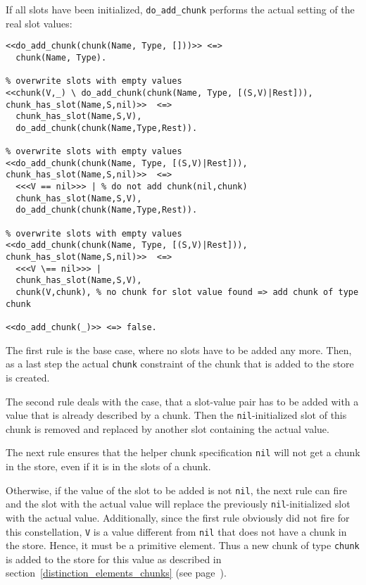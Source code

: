 If all slots have been initialized, \lstinline|do_add_chunk| performs the actual setting of the real slot values:
  
\begin{lstlisting}[caption={Additional rules for adding chunks}]  
% base case
<<do_add_chunk(chunk(Name, Type, []))>> <=> 
  chunk(Name, Type). 

% overwrite slots with empty values
<<chunk(V,_) \ do_add_chunk(chunk(Name, Type, [(S,V)|Rest])), chunk_has_slot(Name,S,nil)>>  <=>
  chunk_has_slot(Name,S,V), 
  do_add_chunk(chunk(Name,Type,Rest)).

% overwrite slots with empty values  
<<do_add_chunk(chunk(Name, Type, [(S,V)|Rest])), chunk_has_slot(Name,S,nil)>>  <=> 
  <<<V == nil>>> | % do not add chunk(nil,chunk)
  chunk_has_slot(Name,S,V), 
  do_add_chunk(chunk(Name,Type,Rest)).  

% overwrite slots with empty values  
<<do_add_chunk(chunk(Name, Type, [(S,V)|Rest])), chunk_has_slot(Name,S,nil)>>  <=> 
  <<<V \== nil>>> |
  chunk_has_slot(Name,S,V), 
  chunk(V,chunk), % no chunk for slot value found => add chunk of type chunk 
  
<<do_add_chunk(_)>> <=> false.
\end{lstlisting}

The first rule is the base case, where no slots have to be added any more. Then, as a last step the actual \lstinline|chunk| constraint of the chunk that is added to the store is created.

The second rule deals with the case, that a slot-value pair has to be added with a value that is already described by a chunk. Then the \lstinline|nil|-initialized slot of this chunk is removed and replaced by another slot containing the actual value.

The next rule ensures that the helper chunk specification \lstinline|nil| will not get a chunk in the store, even if it is in the slots of a chunk.

Otherwise, if the value of the slot to be added is not \lstinline|nil|, the next rule can fire and the slot with the actual value will replace the previously \lstinline|nil|-initialized slot with the actual value. Additionally, since the first rule obviously did not fire for this constellation, \lstinline|V| is a value different from \lstinline|nil| that does not have a chunk in the store. Hence, it must be a primitive element. Thus a new chunk of type \lstinline|chunk| is added to the store for this value as described in section~\ref{distinction_elements_chunks} (see page~\pageref{distinction_elements_chunks}).

